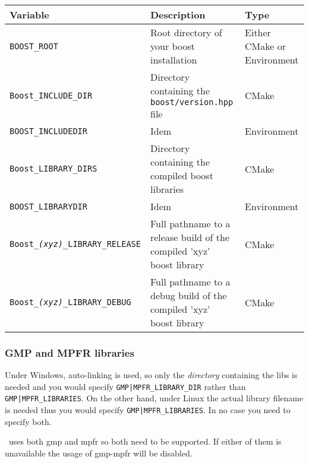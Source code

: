 \renewcommand{\arraystretch}{1.3}
\gdef\lcTabularBorder{2}
\begin{tabular}{|l|l|l|} \hline
  \textbf{Variable}                             & \textbf{Description}                                                 & \textbf{Type}\\\hline\hline
  \texttt{BOOST\_ROOT}\footnotemark[16]         & Root directory of your boost installation                            & Either CMake or Environment\\\hline
  \texttt{Boost\_INCLUDE\_DIR}                  & Directory containing the \texttt{boost/version.hpp} file             & CMake\\\hline
  \texttt{BOOST\_INCLUDEDIR}                    & Idem                                                                 & Environment\\\hline
  \texttt{Boost\_LIBRARY\_DIRS}                 & Directory containing the compiled boost libraries                    & CMake\\\hline
  \texttt{BOOST\_LIBRARYDIR}                    & Idem                                                                 & Environment\\\hline
  \texttt{Boost\_{\em (xyz)}\_LIBRARY\_RELEASE} & Full pathname to a release build of the compiled 'xyz' boost library & CMake\\\hline
  \texttt{Boost\_{\em (xyz)}\_LIBRARY\_DEBUG}   & Full pathname to a debug build of the compiled 'xyz' boost library   & CMake\\\hline
\end{tabular}
\addtocounter{footnote}{1}

\subsubsection{GMP and MPFR libraries}

Under Windows, auto-linking is used, so only the {\em directory} 
containing the libs is needed and you would specify \texttt{GMP|MPFR\_LIBRARY\_DIR} rather than
\texttt{GMP|MPFR\_LIBRARIES}. On the other hand, under Linux the actual library filename is needed 
thus you would specify \texttt{GMP|MPFR\_LIBRARIES}. In no case you need to specify both.

\cgal\ uses both gmp and mpfr so both need to be supported. If either of them is unavailable the 
usage of gmp-mpfr will be disabled.

